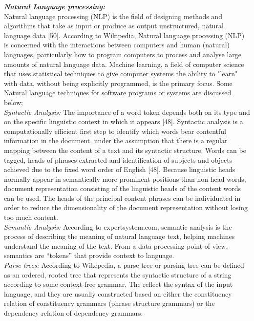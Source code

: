 \documentclass[a4paper]{article}
\begin{document}
\textbf{\textit{Natural Language processing:}}\\
Natural language processing (NLP) is the field of designing methods and algorithms that take as input or produce as output unstructured, natural language data [50]. According to Wikipedia, Natural language processing (NLP) is concerned with the interactions between computers and human (natural) languages, particularly how to program computers to process and analyse large amounts of natural language data. Machine learning, a field of computer science that uses statistical techniques to give computer systems the ability to "learn" with data, without being explicitly programmed, is the primary focus. Some Natural language techniques for software programs or systems are discussed below;\\

\textit{Syntactic Analysis:} The importance of a word token depends both on its type and on the specific linguistic context in which it appears [48]. Syntactic analysis is a computationally efficient first step to identify which words bear contentful information in the document, under the assumption that there is a regular mapping between the content of a text and its syntactic structure. Words can be tagged, heads of phrases extracted and identification of subjects and objects achieved due to the fixed word order of English [48]. Because linguistic heads normally appear in semantically more prominent positions than non-head words, document representation consisting of the linguistic heads of the content words can be used. The heads of the principal content phrases can be individuated in order to reduce the dimensionality of the document representation without losing too much content.\\

\textit{Semantic Analysis:} According to expertsystem.com, semantic analysis is the process of describing the meaning of natural language text, helping machines understand the meaning of the text. From a data processing point of view, semantics are “tokens” that provide context to language. \\

\textit{Parse trees:} According to Wikepedia, a parse tree or parsing tree can be defined as an ordered, rooted tree that represents the syntactic structure of a string according to some context-free grammar. The reflect the syntax of the input language, and they are usually constructed based on either the constituency relation of constituency grammars (phrase structure grammars) or the dependency relation of dependency grammars.  \\
\end{document}
